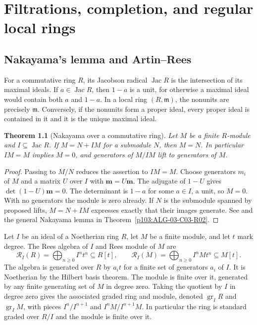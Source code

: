\documentclass[11pt,oneside,openany]{book}
\newtheorem{theorem}{Theorem}[chapter]
\theoremstyle{definition}
\theoremstyle{remark}
\begin{document}
\chapter[Completion and regular local rings]
{Filtrations, completion, and regular local rings}
\label{p103:ch07}

\section{Nakayama's lemma and Artin--Rees}

For a commutative ring \(R\), its Jacobson radical \(\operatorname{Jac}R\) is the intersection of its maximal ideals. If \(a\in\operatorname{Jac}R\), then \(1-a\) is a unit, for otherwise a maximal ideal would contain both \(a\) and \(1-a\). In a local ring \((R,\mathfrak m)\), the nonunits are precisely \(\mathfrak m\). Conversely, if the nonunits form a proper ideal, every proper ideal is contained in it and it is the unique maximal ideal.

\begin{theorem}[Nakayama over a commutative ring]\label{p103:ALG-05-C04-R01}
Let \(M\) be a finite \(R\)-module and \(I\subseteq\operatorname{Jac}R\). If \(M=N+IM\) for a submodule \(N\), then \(M=N\). In particular \(IM=M\) implies \(M=0\), and generators of \(M/IM\) lift to generators of \(M\).
\end{theorem}
\begin{proof}
Passing to \(M/N\) reduces the assertion to \(IM=M\). Choose generators \(m_i\) of \(M\) and a matrix \(U\) over \(I\) with \(\mathbf m=U\mathbf m\). The adjugate of \(1-U\) gives \(\det(1-U)\mathbf m=0\). The determinant is \(1-a\) for some \(a\in I\), a unit, so \(M=0\). With no generators the module is zero already. If \(N\) is the submodule spanned by proposed lifts, \(M=N+IM\) expresses exactly that their images generate. See \cite[Corollary 4.8]{eisenbud} and the general Nakayama lemma in Theorem~\ref{p103:ALG-03-C03-R02}.
\end{proof}

Let \(I\) be an ideal of a Noetherian ring \(R\), let \(M\) be a finite module, and let \(t\) mark degree. The Rees algebra of \(I\) and Rees module of \(M\) are
\[
 \mathcal R_I(R)=\bigoplus_{n\ge0} I^nt^n\subseteq R[t],
 \qquad \mathcal R_I(M)=\bigoplus_{n\ge0} I^nMt^n\subseteq M[t].
\]
The algebra is generated over \(R\) by \(a_it\) for a finite set of generators \(a_i\) of \(I\). It is Noetherian by the Hilbert basis theorem. The module is finite over it, generated by any finite generating set of \(M\) in degree zero. Taking the quotient by \(I\) in degree zero gives the associated graded ring and module, denoted \(\operatorname{gr}_I R\) and \(\operatorname{gr}_I M\), with pieces \(I^n/I^{n+1}\) and \(I^nM/I^{n+1}M\). In particular the ring is standard graded over \(R/I\) and the module is finite over it.
\end{document}
